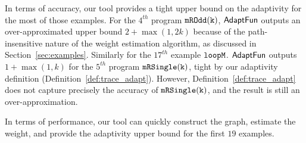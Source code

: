In terms of accuracy, our tool provides a tight
upper bound on the adaptivity for the most of those examples. 
 For the $4^{th}$ program $\mathtt{mROdd(k)}$, $\textsf{AdaptFun}$ outputs an over-approximated upper bound 
 $2 + \max(1, 2k)$ because of the path-insensitive nature of the weight estimation algorithm, as discussed in Section~\ref{sec:examples}. 
 Similarly for the $17^{th}$ example $\mathtt{loopM}$. 
$\textsf{AdaptFun}$ outputs $1 + \max(1, k) $ for the $5^{th}$ program $\mathtt{mRSingle(k)}$,  tight by our adaptivity definition (Definition~\ref{def:trace_adapt}).
However, Definition~\ref{def:trace_adapt} does not capture precisely the accuracy  of $\mathtt{mRSingle(k)}$,
and the result is still an over-approximation.

In terms of performance, our tool can quickly construct the graph, estimate the weight,
and provide the adaptivity upper bound for the first $19$ examples. 


